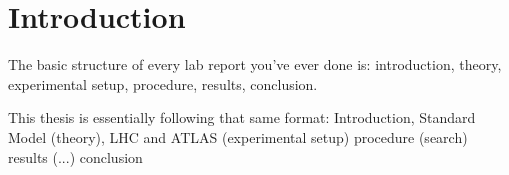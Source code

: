 \chapter{Introduction}\label{chapter:introduction}

The basic structure of every lab report you've ever done is: 
    introduction,
    theory,
    experimental setup,
    procedure,
    results,
    conclusion.

This thesis is essentially following that same format:
    Introduction,
    Standard Model (theory),
    LHC and ATLAS (experimental setup)
    procedure (search)
    results (...)
    conclusion




